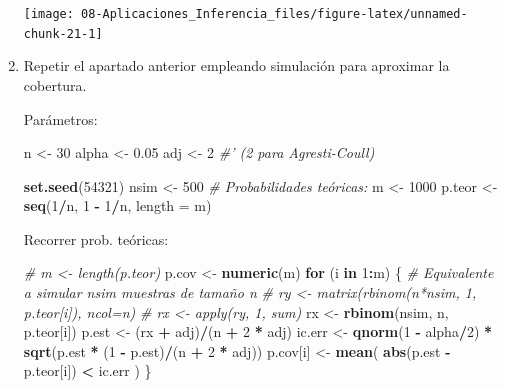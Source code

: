 \documentclass[
]{book}
\newenvironment{Shaded}{\begin{snugshade}}{\end{snugshade}}
\newcommand{\CommentTok}[1]{\textcolor[rgb]{0.56,0.35,0.01}{\textit{#1}}}
\newcommand{\ControlFlowTok}[1]{\textcolor[rgb]{0.13,0.29,0.53}{\textbf{#1}}}
\newcommand{\DataTypeTok}[1]{\textcolor[rgb]{0.13,0.29,0.53}{#1}}
\newcommand{\DecValTok}[1]{\textcolor[rgb]{0.00,0.00,0.81}{#1}}
\newcommand{\FloatTok}[1]{\textcolor[rgb]{0.00,0.00,0.81}{#1}}
\newcommand{\KeywordTok}[1]{\textcolor[rgb]{0.13,0.29,0.53}{\textbf{#1}}}
\newcommand{\NormalTok}[1]{#1}
\newcommand{\OperatorTok}[1]{\textcolor[rgb]{0.81,0.36,0.00}{\textbf{#1}}}
\newcommand{\StringTok}[1]{\textcolor[rgb]{0.31,0.60,0.02}{#1}}
\theoremstyle{break}
\theoremstyle{definition}
\theoremstyle{definition}
\theoremstyle{definition}
\theoremstyle{remark}
\begin{document}
\begin{enumerate}
  \begin{center}\texttt{[image: 08-Aplicaciones\_Inferencia\_files/figure-latex/unnamed-chunk-21-1]} \end{center}
\item
  Repetir el apartado anterior empleando simulación para aproximar
  la cobertura.

  Parámetros:

\begin{Shaded}
\begin{Highlighting}[]
\NormalTok{n <-}\StringTok{ }\DecValTok{30}
\NormalTok{alpha <-}\StringTok{ }\FloatTok{0.05}
\NormalTok{adj <-}\StringTok{ }\DecValTok{2}  \CommentTok{#' (2 para Agresti-Coull)}

\KeywordTok{set.seed}\NormalTok{(}\DecValTok{54321}\NormalTok{)}
\NormalTok{nsim <-}\StringTok{ }\DecValTok{500} 
\CommentTok{# Probabilidades teóricas:}
\NormalTok{m <-}\StringTok{ }\DecValTok{1000}
\NormalTok{p.teor <-}\StringTok{ }\KeywordTok{seq}\NormalTok{(}\DecValTok{1}\OperatorTok{/}\NormalTok{n, }\DecValTok{1} \OperatorTok{-}\StringTok{ }\DecValTok{1}\OperatorTok{/}\NormalTok{n, }\DataTypeTok{length =}\NormalTok{ m) }
\end{Highlighting}
\end{Shaded}

  Recorrer prob. teóricas:

\begin{Shaded}
\begin{Highlighting}[]
\CommentTok{# m <- length(p.teor)}
\NormalTok{p.cov <-}\StringTok{ }\KeywordTok{numeric}\NormalTok{(m)}
\ControlFlowTok{for}\NormalTok{ (i }\ControlFlowTok{in} \DecValTok{1}\OperatorTok{:}\NormalTok{m) \{}
  \CommentTok{# Equivalente a simular nsim muestras de tamaño n}
  \CommentTok{# ry <- matrix(rbinom(n*nsim, 1, p.teor[i]), ncol=n)}
  \CommentTok{# rx <- apply(ry, 1, sum)}
\NormalTok{  rx <-}\StringTok{ }\KeywordTok{rbinom}\NormalTok{(nsim, n, p.teor[i])}
\NormalTok{  p.est <-}\StringTok{ }\NormalTok{(rx }\OperatorTok{+}\StringTok{ }\NormalTok{adj)}\OperatorTok{/}\NormalTok{(n }\OperatorTok{+}\StringTok{ }\DecValTok{2} \OperatorTok{*}\StringTok{ }\NormalTok{adj)  }
\NormalTok{  ic.err <-}\StringTok{ }\KeywordTok{qnorm}\NormalTok{(}\DecValTok{1} \OperatorTok{-}\StringTok{ }\NormalTok{alpha}\OperatorTok{/}\DecValTok{2}\NormalTok{) }\OperatorTok{*}\StringTok{ }\KeywordTok{sqrt}\NormalTok{(p.est }\OperatorTok{*}\StringTok{ }\NormalTok{(}\DecValTok{1} \OperatorTok{-}\StringTok{ }\NormalTok{p.est)}\OperatorTok{/}\NormalTok{(n }\OperatorTok{+}\StringTok{ }\DecValTok{2} \OperatorTok{*}\StringTok{ }\NormalTok{adj))}
\NormalTok{  p.cov[i] <-}\StringTok{ }\KeywordTok{mean}\NormalTok{( }\KeywordTok{abs}\NormalTok{(p.est }\OperatorTok{-}\StringTok{ }\NormalTok{p.teor[i]) }\OperatorTok{<}\StringTok{ }\NormalTok{ic.err )}
\NormalTok{\}}
\end{Highlighting}
\end{Shaded}


\end{enumerate}
\end{document}
